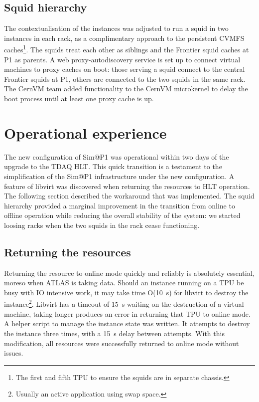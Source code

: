 \documentclass{webofc}
\begin{document}
\subsection{Squid hierarchy}
\label{sec:hierarchy}
The contextualisation of the instances was adjusted to run a squid in two
instances in each rack, as a complimentary approach to the persistent CVMFS
caches\footnote{The first and fifth TPU to ensure the squids are in
separate chassis.}. The squids treat each other as siblings and the Frontier
squid caches at P1 as parents. A web proxy-autodiscovery service is set up to
connect virtual machines to proxy caches on boot: those serving a squid
connect to the central Frontier squids at P1, others are connected to the two
squids in the same rack. The CernVM team added functionality to the CernVM
microkernel to delay the boot process until at least one proxy cache is up.


\section{Operational experience}
\label{sec:ops}
The new configuration of Sim@P1 was operational within two days of the upgrade
to the TDAQ HLT. This quick transition is a testament to the simplification of
the Sim@P1 infrastructure under the new configuration. A feature of libvirt was
discovered when
returning the resources to HLT operation. The following section described the
workaround that was implemented. The squid hierarchy provided a marginal
improvement in the transition from online to offline operation while reducing
the
overall stability of the system: we started loosing racks when the two squids in
the rack cease functioning.

\subsection{Returning the resources}
\label{sec:return}
Returning the resource to online mode quickly and reliably is absolutely
essential, moreso when ATLAS is taking data.
Should an instance running on a TPU be busy with IO intensive work, it may take
time O(10~\textrm{s}) for libvirt to destroy the instance\footnote{Usually an
active application using swap space.}. Libvirt has a timeout of
15~\textrm{s} waiting
on the destruction of a virtual machine, taking longer produces an error in
returning that TPU to online mode. A helper script to manage the instance state
was written. It attempts to destroy the instance three
times, with a 15~\textrm{s} delay between attempts. With this modification, all
resources were successfully returned to online mode without issues.
\end{document}

